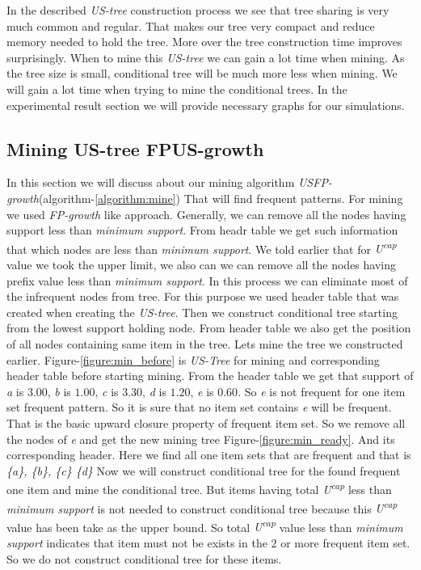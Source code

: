     
    In the described \emph{US-tree} construction process we see that tree sharing is very much common and regular. That makes our tree very compact and reduce memory needed to hold the tree. More over the tree construction time improves surprisingly. When to mine this \emph{US-tree} we can gain a lot time when mining. As the tree size is small, conditional tree will be much more less when mining. We will gain a lot time when trying to mine the conditional trees. In the experimental result section we will provide necessary graphs for our simulations.
    \subsection{Mining US-tree FPUS-growth}
    In this section we will discuss about our mining algorithm \emph{USFP-growth}(algorithm-\ref{algorithm:mine}) That will find frequent patterns. For mining we used \emph{FP-growth} like approach. Generally, we can remove all the nodes having support less than \emph{minimum support}. From headr table we get such information that which nodes are less than \emph{minimum support}. We told earlier that for \emph{U\textsuperscript{cap}} value we took the upper limit, we also can we can remove all the nodes having prefix value less than \emph{minimum support}. In this process we can eliminate most of the infrequent nodes from tree. For this purpose we used header table that was created when creating the \emph{US-tree}. Then we construct conditional tree starting from the lowest support holding node. From header table we also get the position of all nodes containing same item in the tree. 
    Lets mine the tree we constructed earlier. Figure-\ref{figure:min_before} is \emph{US-Tree} for mining and corresponding header table before starting mining. From the header table we get that support of \emph{a} is $3.00$, \emph{b} is $1.00$, \emph{c} is $3.30$, \emph{d} is $1.20$, \emph{e} is $0.60$. So \emph{e} is not frequent for one item set frequent pattern. So it is sure that no item set contains \emph{e} will be frequent. That is the basic upward closure property of frequent item set. So we remove all the nodes of \emph{e} and get the new mining tree Figure-\ref{figure:min_ready}. And its corresponding header. Here we find all one item sets that are frequent and that is \emph{\{a\}, \{b\}, \{c\} \{d\}} Now we will construct conditional tree for the found frequent one item and mine the conditional tree. But items having total \emph{U\textsuperscript{cap}} less than \emph{minimum support} is not needed to construct conditional tree because this \emph{U\textsuperscript{cap}} value has been take as the upper bound. So total \emph{U\textsuperscript{cap}} value less than \emph{minimum support} indicates that item must not be exists in the $2$ or more frequent item set. So we do not construct conditional tree for these items.
